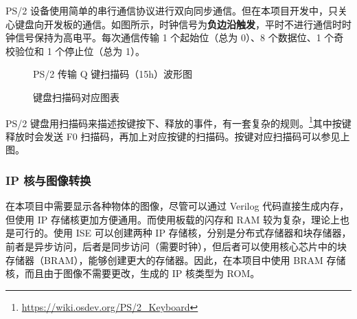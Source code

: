 \documentclass[hyperref,UTF8,12pt,a4paper]{ctexart}
\begin{document}
PS/2
设备使用简单的串行通信协议进行双向同步通信。但在本项目开发中，只关心键盘向开发板的通信。如图所示，时钟信号为\textbf{负边沿触发}，平时不进行通信时时钟信号保持为高电平。每次通信传输
1 个起始位（总为 0）、8 个数据位、1 个奇校验位和 1 个停止位（总为 1）。

\begin{figure}[H]
\centering
{}
\caption{PS/2 传输 Q 键扫描码（15h）波形图}
\end{figure}

\begin{figure}[H]
\centering
{}
\caption{键盘扫描码对应图表}
\end{figure}

PS/2
键盘用扫描码来描述按键按下、释放的事件，有一套复杂的规则。\footnote{\url{https://wiki.osdev.org/PS/2_Keyboard}}其中按键释放时会发送
F0 扫描码，再加上对应按键的扫描码。按键对应扫描码可以参见上图。

\hypertarget{ip-ux6838ux4e0eux56feux50cfux8f6cux6362}{%
\subsubsection{IP
核与图像转换}\label{ip-ux6838ux4e0eux56feux50cfux8f6cux6362}}

在本项目中需要显示各种物体的图像，尽管可以通过 Verilog
代码直接生成内存，但使用 IP 存储核更加方便通用。而使用板载的闪存和 RAM
较为复杂，理论上也是可行的。使用 ISE 可以创建两种 IP
存储核，分别是分布式存储器和块存储器，前者是异步访问，后者是同步访问（需要时钟），但后者可以使用核心芯片中的块存储器（BRAM），能够创建更大的存储器。因此，在本项目中使用
BRAM 存储核，而且由于图像不需要更改，生成的 IP 核类型为 ROM。
\end{document}
